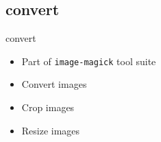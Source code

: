 \subsection{convert}

\begin{frame}[fragile]{convert}
  \begin{itemize}
    \pause \item Part of \texttt{image-magick} tool suite
    \pause \item Convert images
    \pause \item Crop images
    \pause \item Resize images
  \end{itemize}
\end{frame}

